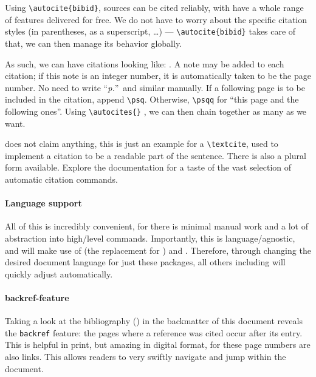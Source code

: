 Using \verb|\autocite{bibid}|, sources can be cited reliably, with have a whole range
of features delivered for free.
We do not have to worry about the specific citation styles
(in parentheses, as a superscript, \dots) ---
\verb|\autocite{bibid}| takes care of that, we can then manage its behavior globally.

As such, we can have citations looking like:
\cites[8]{einstein_zur_1905}[29\psqq]{goossens_latex_1993}[2-9]{knuth_knuth_nodate}%
[89\psq]{knuth_fundamental_1973}{dirac_principles_1981}
.
A note may be added to each citation; if this note is an integer number, it is
automatically taken to be the page number.
No need to write \enquote{\emph{p.}}\ and similar manually.
If a following page is to be included in the citation, append \verb|\psq|.
Otherwise, \verb|\psqq| for \enquote{this page and the following ones}.
Using \verb|\autocites{}| , we can then chain together as many as we want.

\textcite[3]{dirac_principles_1981} does not claim anything, this is just an example
for a \verb|\textcite|, used to implement a citation to be a readable part of the
sentence.
There is also a plural form available.
Explore the documentation for a taste of the vast selection of automatic citation
commands.

\paragraph{Language support}
All of this is incredibly convenient, for there is minimal manual work and a lot
of abstraction into high\-/level commands.
Importantly, this is language\-/agnostic, and  will make use
of  (the  replacement for )
and .
Therefore, through changing the desired document language for just these packages,
all others including  will quickly adjust automatically.

\paragraph{backref-feature}
Taking a look at the bibliography () in the backmatter
of this document reveals the \texttt{backref} feature:
the pages where a reference was cited occur after its entry.
This is helpful in print, but amazing in digital format, for these page numbers
are also links.
This allows readers to very swiftly navigate and jump within the document.

